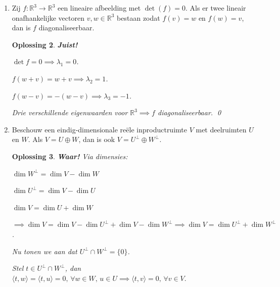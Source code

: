 \documentclass[a4paper,12pt]{article}
\newtheorem{oplossing}{Oplossing}
\begin{document}
\begin{enumerate}
\begin{oplossing}
        Dan geldt:
        \(g\left( f\left(\begin{pmatrix}
            a \\ b
        \end{pmatrix}\right) \right)
        =
        g\left( \begin{pmatrix}
            a \\ b \\ a+b
        \end{pmatrix}\right) 
        =
        \begin{pmatrix}
            a \\ b
        \end{pmatrix}
        = \operatorname{id}_V.
        \)

        Maar \(\dim V \neq \dim W\). \qed
    \end{oplossing}
    \item[(iii)] Zij $f:\mathbb{R}^{3} \to \mathbb{R}^{3}$ een lineaire afbeelding met $\det(f)=0$. Als er twee lineair onafhankelijke vectoren $v,w \in \mathbb{R}^{3}$ bestaan zodat $f(v)=w$ en $f(w)=v$, dan is $f$ diagonaliseerbaar.
    \begin{oplossing}
        \textbf{Juist!}

        \(\det f = 0 \implies \lambda_1 = 0\).

        \(f(w+v) = w+v \implies \lambda_2 = 1\).

        \(f(w-v) = -(w-v) \implies \lambda_3 = -1\).

        Drie verschillende eigenwaarden voor \(\mathbb{R}^3 \implies f\) diagonaliseerbaar. \qed 
    \end{oplossing}
    \item[(iv)] Beschouw een eindig-dimensionale reële inproductruimte $V$ met deelruimten $U$ en $W$. Als $V=U \oplus W$, dan is ook $V=U^{\perp} \oplus W^{\perp}$.
    \begin{oplossing}
        \textbf{Waar!}
        Via dimensies:

        \(\dim W^\perp = \dim V - \dim W\)

        \(\dim U^\perp = \dim V - \dim U\)

        \(\dim V = \dim U + \dim W \)
        
        \(\implies \dim V = \dim V - \dim U^\perp + \dim V - \dim W^\perp \implies \dim V = \dim U^\perp + \dim W^\perp\).

        Nu tonen we aan dat \(U^\perp \cap W^\perp = \{0\}\).

        Stel \(t \in U^\perp \cap W^\perp \), dan \(\langle t,w \rangle = \langle t,u \rangle = 0 ,\, \forall w \in W, \, u \in U \implies \langle t,v \rangle = 0 , \, \forall v \in V .\)
    

\end{oplossing}
\end{enumerate}
\end{document}
